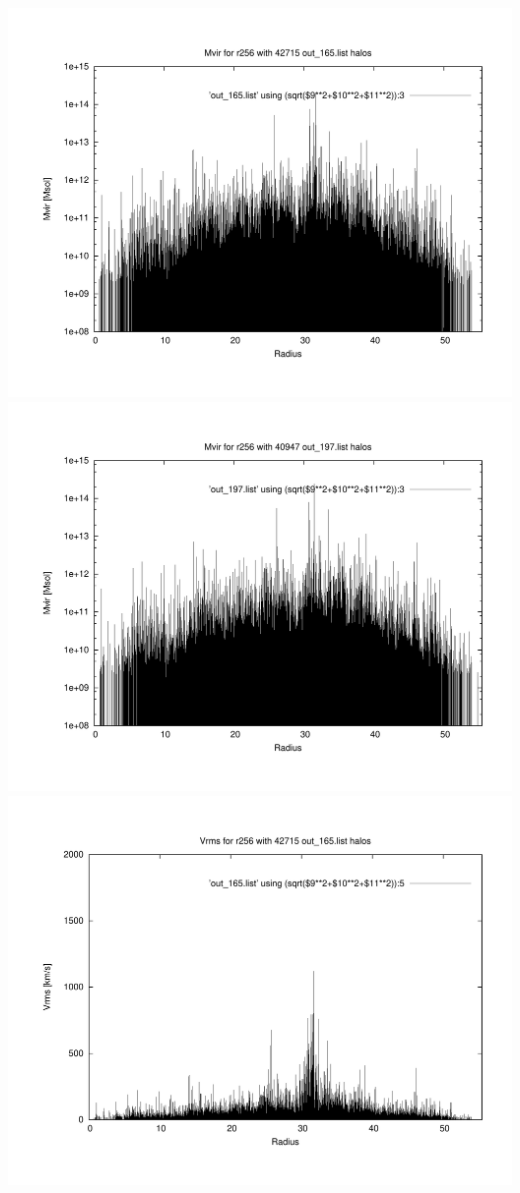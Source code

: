 \includegraphics[scale=0.3]{r256/h100/red_st14_log2/plot_mvir_out_165.pdf}
\includegraphics[scale=0.3]{r256/h100/red_st14_log2/plot_mvir_out_197.pdf}
\includegraphics[scale=0.3]{r256/h100/red_st14_log2/plot_Vrms_out_165.pdf}
